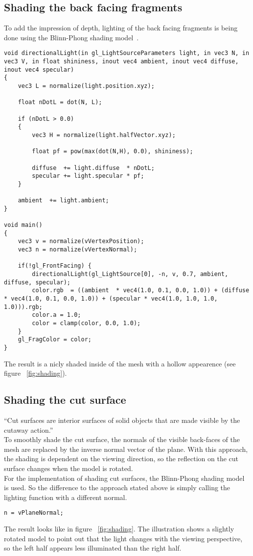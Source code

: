 \subsection{Shading the back facing fragments}
To add the impression of depth, lighting of the back facing fragments is being done using the Blinn-Phong shading model~\cite{book:computerGraphicsHearn}.
\begin{lstlisting}
void directionalLight(in gl_LightSourceParameters light, in vec3 N, in vec3 V, in float shininess, inout vec4 ambient, inout vec4 diffuse, inout vec4 specular)
{
	vec3 L = normalize(light.position.xyz);
	 
	float nDotL = dot(N, L);
	 
	if (nDotL > 0.0)
	{   
		vec3 H = normalize(light.halfVector.xyz);
			 
		float pf = pow(max(dot(N,H), 0.0), shininess);

		diffuse  += light.diffuse  * nDotL;
		specular += light.specular * pf;
	}
	 
	ambient  += light.ambient;
}

void main()
{
	vec3 v = normalize(vVertexPosition);
	vec3 n = normalize(vVertexNormal);
	
	if(!gl_FrontFacing) {
		directionalLight(gl_LightSource[0], -n, v, 0.7, ambient, diffuse, specular);
		color.rgb  = ((ambient  * vec4(1.0, 0.1, 0.0, 1.0)) + (diffuse  * vec4(1.0, 0.1, 0.0, 1.0)) + (specular * vec4(1.0, 1.0, 1.0, 1.0))).rgb;			
		color.a = 1.0;			
		color = clamp(color, 0.0, 1.0);
	}
	gl_FragColor = color;
}
\end{lstlisting}

The result is a nicly shaded inside of the mesh with a hollow appearence (see figure ~\ref{fig:shading}).

\subsection{Shading the cut surface}
"`Cut surfaces are interior surfaces of solid objects that are made visible by the cutaway action."'~\cite{jour:adaptiveCutaways}\\
To smoothly shade the cut surface, the normals of the visible back-faces of the mesh are replaced by the inverse normal vector of the plane. With this approach, the shading is dependent on the viewing direction, so the reflection on the cut surface changes when the model is rotated.\\
For the implementation of shading cut surfaces, the Blinn-Phong shading model is used. So the difference to the approach stated above is simply calling the lighting function with a different normal.
\begin{lstlisting}
n = vPlaneNormal;
\end{lstlisting}
The result looks like in figure ~\ref{fig:shading}. The illustration shows a slightly rotated model to point out that the light changes with the viewing perspective, so the left half appears less illuminated than the right half.

